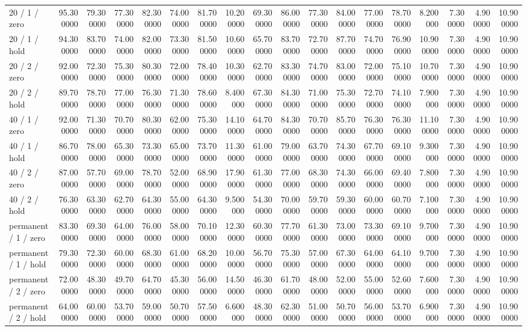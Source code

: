 \begin{tabular}{lrrrrrrrrrrrrrrrrr}
20 / 1 / zero & 95.300000 & 79.300000 & 77.300000 & 82.300000 & 74.000000 & 81.700000 & 10.200000 & 69.300000 & 86.000000 & 77.300000 & 84.000000 & 77.000000 & 78.700000 & 8.200000 & 7.300000 & 4.900000 & 10.900000 \\
20 / 1 / hold & 94.300000 & 83.700000 & 74.000000 & 82.000000 & 73.300000 & 81.500000 & 10.600000 & 65.700000 & 83.700000 & 72.700000 & 87.700000 & 74.700000 & 76.900000 & 10.900000 & 7.300000 & 4.900000 & 10.900000 \\
20 / 2 / zero & 92.000000 & 72.300000 & 75.300000 & 80.300000 & 72.000000 & 78.400000 & 10.300000 & 62.700000 & 83.300000 & 74.700000 & 83.000000 & 72.000000 & 75.100000 & 10.700000 & 7.300000 & 4.900000 & 10.900000 \\
20 / 2 / hold & 89.700000 & 78.700000 & 77.000000 & 76.300000 & 71.300000 & 78.600000 & 8.400000 & 67.300000 & 84.300000 & 71.000000 & 75.300000 & 72.700000 & 74.100000 & 7.900000 & 7.300000 & 4.900000 & 10.900000 \\
40 / 1 / zero & 92.000000 & 71.300000 & 70.700000 & 80.300000 & 62.000000 & 75.300000 & 14.100000 & 64.700000 & 84.300000 & 70.700000 & 85.700000 & 76.300000 & 76.300000 & 11.100000 & 7.300000 & 4.900000 & 10.900000 \\
40 / 1 / hold & 86.700000 & 78.000000 & 65.300000 & 73.300000 & 65.000000 & 73.700000 & 11.300000 & 61.000000 & 79.000000 & 63.700000 & 74.300000 & 67.700000 & 69.100000 & 9.300000 & 7.300000 & 4.900000 & 10.900000 \\
40 / 2 / zero & 87.000000 & 57.700000 & 69.000000 & 78.700000 & 52.000000 & 68.900000 & 17.900000 & 61.300000 & 77.000000 & 68.300000 & 74.300000 & 66.000000 & 69.400000 & 7.800000 & 7.300000 & 4.900000 & 10.900000 \\
40 / 2 / hold & 76.300000 & 63.300000 & 62.700000 & 64.300000 & 55.000000 & 64.300000 & 9.500000 & 54.300000 & 70.000000 & 59.700000 & 59.300000 & 60.000000 & 60.700000 & 7.100000 & 7.300000 & 4.900000 & 10.900000 \\
permanent / 1 / zero & 83.300000 & 69.300000 & 64.000000 & 76.000000 & 58.000000 & 70.100000 & 12.300000 & 60.300000 & 77.700000 & 61.300000 & 73.000000 & 73.300000 & 69.100000 & 9.700000 & 7.300000 & 4.900000 & 10.900000 \\
permanent / 1 / hold & 79.300000 & 72.300000 & 60.000000 & 68.300000 & 61.000000 & 68.200000 & 10.000000 & 56.700000 & 75.300000 & 57.000000 & 67.300000 & 64.000000 & 64.100000 & 9.700000 & 7.300000 & 4.900000 & 10.900000 \\
permanent / 2 / zero & 72.000000 & 48.300000 & 49.700000 & 64.700000 & 45.300000 & 56.000000 & 14.500000 & 46.300000 & 61.700000 & 48.000000 & 52.000000 & 55.000000 & 52.600000 & 7.600000 & 7.300000 & 4.900000 & 10.900000 \\
permanent / 2 / hold & 64.000000 & 60.000000 & 53.700000 & 59.000000 & 50.700000 & 57.500000 & 6.600000 & 48.300000 & 62.300000 & 51.000000 & 50.700000 & 56.000000 & 53.700000 & 6.900000 & 7.300000 & 4.900000 & 10.900000 \\
\bottomrule
\end{tabular}
